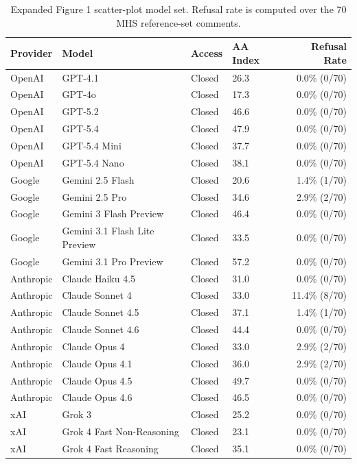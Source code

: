 \documentclass[11pt]{article}
\begin{document}
\clearpage
\begin{table}[t!]
\centering
\caption{Expanded Figure 1 scatter-plot model set. Refusal rate is computed over the 70 MHS reference-set comments.}
\label{tab:expanded-scatter-models}
\begin{tabular}{llllr}
\toprule
Provider & Model & Access & AA Index & Refusal Rate \\
\midrule
OpenAI & GPT-4.1 & Closed & 26.3 & 0.0\% (0/70) \\
OpenAI & GPT-4o & Closed & 17.3 & 0.0\% (0/70) \\
OpenAI & GPT-5.2 & Closed & 46.6 & 0.0\% (0/70) \\
OpenAI & GPT-5.4 & Closed & 47.9 & 0.0\% (0/70) \\
OpenAI & GPT-5.4 Mini & Closed & 37.7 & 0.0\% (0/70) \\
OpenAI & GPT-5.4 Nano & Closed & 38.1 & 0.0\% (0/70) \\
Google & Gemini 2.5 Flash & Closed & 20.6 & 1.4\% (1/70) \\
Google & Gemini 2.5 Pro & Closed & 34.6 & 2.9\% (2/70) \\
Google & Gemini 3 Flash Preview & Closed & 46.4 & 0.0\% (0/70) \\
Google & Gemini 3.1 Flash Lite Preview & Closed & 33.5 & 0.0\% (0/70) \\
Google & Gemini 3.1 Pro Preview & Closed & 57.2 & 0.0\% (0/70) \\
Anthropic & Claude Haiku 4.5 & Closed & 31.0 & 0.0\% (0/70) \\
Anthropic & Claude Sonnet 4 & Closed & 33.0 & 11.4\% (8/70) \\
Anthropic & Claude Sonnet 4.5 & Closed & 37.1 & 1.4\% (1/70) \\
Anthropic & Claude Sonnet 4.6 & Closed & 44.4 & 0.0\% (0/70) \\
Anthropic & Claude Opus 4 & Closed & 33.0 & 2.9\% (2/70) \\
Anthropic & Claude Opus 4.1 & Closed & 36.0 & 2.9\% (2/70) \\
Anthropic & Claude Opus 4.5 & Closed & 49.7 & 0.0\% (0/70) \\
Anthropic & Claude Opus 4.6 & Closed & 46.5 & 0.0\% (0/70) \\
xAI & Grok 3 & Closed & 25.2 & 0.0\% (0/70) \\
xAI & Grok 4 Fast Non-Reasoning & Closed & 23.1 & 0.0\% (0/70) \\
xAI & Grok 4 Fast Reasoning & Closed & 35.1 & 0.0\% (0/70) \\

\end{tabular}
\end{table}
\end{document}
